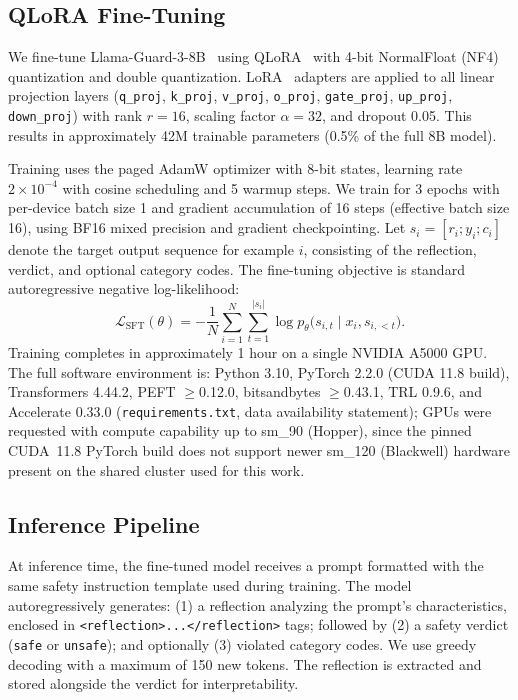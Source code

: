 \documentclass[superintelligence,article,submit,pdftex,moreauthors]{Definitions/mdpi}
\begin{document}
\subsection{QLoRA Fine-Tuning}

We fine-tune Llama-Guard-3-8B~\citep{metallamaguard3} using QLoRA~\citep{dettmers2024qlora} with 4-bit NormalFloat (NF4) quantization and double quantization. LoRA~\citep{hu2022lora} adapters are applied to all linear projection layers (\texttt{q\_proj}, \texttt{k\_proj}, \texttt{v\_proj}, \texttt{o\_proj}, \texttt{gate\_proj}, \texttt{up\_proj}, \texttt{down\_proj}) with rank $r = 16$, scaling factor $\alpha = 32$, and dropout 0.05. This results in approximately 42M trainable parameters (0.5\% of the full 8B model).

Training uses the paged AdamW optimizer with 8-bit states, learning rate $2 \times 10^{-4}$ with cosine scheduling and 5 warmup steps. We train for 3 epochs with per-device batch size 1 and gradient accumulation of 16 steps (effective batch size 16), using BF16 mixed precision and gradient checkpointing. Let $s_i = [r_i; y_i; c_i]$ denote the target output sequence for example $i$, consisting of the reflection, verdict, and optional category codes. The fine-tuning objective is standard autoregressive negative log-likelihood:
\begin{equation}
  \mathcal{L}_{\text{SFT}}(\theta) = - \frac{1}{N} \sum_{i=1}^{N} \sum_{t=1}^{|s_i|}
  \log p_{\theta}\bigl(s_{i,t} \mid x_i, s_{i,<t}\bigr).
\end{equation}
Training completes in approximately 1 hour on a single NVIDIA A5000 GPU. The full software environment is: Python 3.10, PyTorch 2.2.0 (CUDA 11.8 build), Transformers 4.44.2, PEFT $\geq$0.12.0, bitsandbytes $\geq$0.43.1, TRL 0.9.6, and Accelerate 0.33.0 (\texttt{requirements.txt}, data availability statement); GPUs were requested with compute capability up to sm\_90 (Hopper), since the pinned CUDA~11.8 PyTorch build does not support newer sm\_120 (Blackwell) hardware present on the shared cluster used for this work.

\subsection{Inference Pipeline}

At inference time, the fine-tuned model receives a prompt formatted with the same safety instruction template used during training. The model autoregressively generates: (1) a reflection analyzing the prompt's characteristics, enclosed in \texttt{<reflection>...</reflection>} tags; followed by (2) a safety verdict (\texttt{safe} or \texttt{unsafe}); and optionally (3) violated category codes. We use greedy decoding with a maximum of 150 new tokens. The reflection is extracted and stored alongside the verdict for interpretability.
\end{document}
